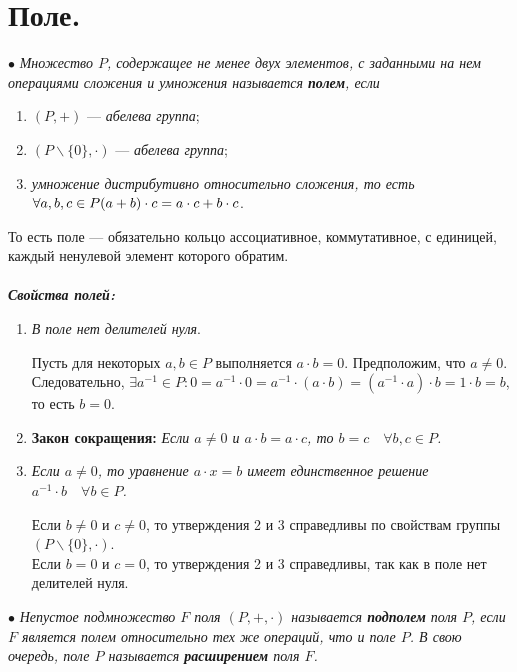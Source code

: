 \section{Поле.}
$\bullet$ \textit{Множество $P$, содержащее не менее двух элементов, с заданными на нем операциями сложения и умножения называется \textbf{полем}, если}\begin{enumerate}
	\item $(P, +)$ --- \textit{абелева группа};
	\item $(P\backslash \{0\}, \cdot)$ --- \textit{абелева группа};
	\item \textit{умножение дистрибутивно относительно сложения, то есть} $\forall a,b,c \in P\\
	(a+b)\cdot c = a\cdot c + b\cdot c$. 
\end{enumerate}
То есть поле --- обязательно кольцо ассоциативное, коммутативное, с единицей, каждый ненулевой элемент которого обратим.\\\\
\textit{\textbf{Свойства полей:}}\begin{enumerate}
	\item \textit{В поле нет делителей нуля}.\begin{Proof}
		Пусть для некоторых $a,b\in P$ выполняется $a\cdot b = 0$. Предположим, что $a\ne 0$. Следовательно, $\exists a^{-1} \in P : 0 = a^{-1}\cdot 0 = a^{-1}\cdot (a\cdot b) = (a^{-1}\cdot a)\cdot b = 1\cdot b = b$, то есть $b = 0$.
	\end{Proof}
	\item \textbf{Закон сокращения:} \textit{Если $a\ne 0$ и $a\cdot b = a\cdot c$, то $b=c\quad \forall b,c \in P$.}
	\item \textit{Если $a\ne 0$, то уравнение $a\cdot x = b$ имеет единственное решение $a^{-1}\cdot b\quad \forall b \in P$.}
	\begin{Proof}
		Если $b\ne 0$ и $c \ne 0$, то утверждения 2 и 3 справедливы по свойствам группы $(P\backslash \{0\}, \cdot)$.\\
		Если $b = 0$ и $c = 0$, то утверждения 2 и 3 справедливы, так как в поле нет делителей нуля.
	\end{Proof}
\end{enumerate}
$\bullet$ \textit{Непустое подмножество $F$ поля $(P, +,\cdot)$ называется \textbf{подполем} поля $P$, если $F$ является полем относительно тех же операций, что и поле $P$. В свою очередь, поле $P$ называется \textbf{расширением} поля $F$.}

